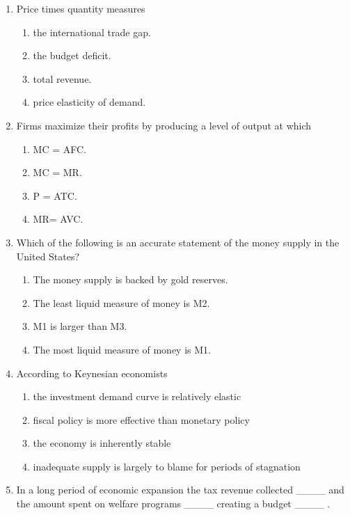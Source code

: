 \documentclass[12pt]{article}
\begin{document}
\begin{enumerate}[label=\arabic*.]
\begin{enumerate}[label=(\alph*)]
    \item A barrel of crude oil
    \item A registered nurse
    \item A share of corporate stock
\end{enumerate}
\item Price times quantity measures
\begin{enumerate}[label=(\alph*)]
    \item the international trade gap.
    \item the budget deficit.
    \item total revenue.
    \item price elasticity of demand.
\end{enumerate}
\item Firms maximize their profits by producing a level of output at which
\begin{enumerate}[label=(\alph*)]
    \item MC = AFC.
    \item MC = MR.
    \item P = ATC.
    \item MR= AVC.
\end{enumerate}
\item Which of the following is an accurate statement of the money supply in the United States?
\begin{enumerate}[label=(\alph*)]
    \item The money supply is backed by gold reserves.
    \item The least liquid measure of money is M2.
    \item M1 is larger than M3.
    \item The most liquid measure of money is M1.
\end{enumerate}
\item According to Keynesian economists
\begin{enumerate}[label=(\alph*)]
    \item the investment demand curve is relatively elastic
    \item fiscal policy is more effective than monetary policy
    \item the economy is inherently stable
    \item inadequate supply is largely to blame for periods of stagnation
\end{enumerate}
\item In a long period of economic expansion the tax revenue collected \_\_\_\_ and the amount spent on welfare programs \_\_\_\_ creating a budget \_\_\_\_ .

\end{enumerate}
\end{document}

